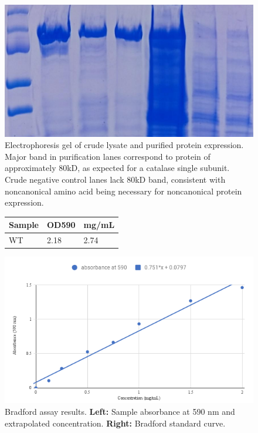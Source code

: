 \documentclass[journal=jacsat,manuscript=article]{achemso}
\begin{document}
\begin{figure}
\centering
\includegraphics[width=0.7\linewidth]{figures/pure-gel}
\caption{Electrophoresis gel of crude lysate and purified protein expression. Major band in purification lanes correspond to protein of approximately 80kD, as expected for a catalase single subunit. Crude negative control lanes lack 80kD band, consistent with noncanonical amino acid being necessary for noncanonical protein expression.}
\label{fig:pure-gel}
\end{figure}

\begin{figure}
  \centering
  \begin{minipage}{.4\textwidth}
    \begin{tabular}{lll}
      \hline
      Sample  & OD590 & mg/mL  \\
      \hline
      WT        & 2.18 & 2.74\\
      \hline
    \end{tabular}
  \end{minipage}
  \begin{minipage}{.59\textwidth}
    \includegraphics[width=\linewidth]{figures/bradford-standard-curve}
  \end{minipage}
  \caption{Bradford assay results. \textbf{Left:} Sample absorbance at 590 nm and extrapolated concentration. \textbf{Right:} Bradford standard curve.}
  \label{fig:bradford-assay}
\end{figure}
\end{document}
